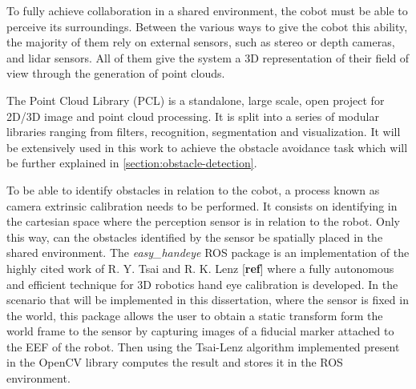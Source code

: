 \par To fully achieve collaboration in a shared environment, the cobot must be able to perceive its surroundings. Between the various ways to give the cobot this ability, the majority of them rely on external sensors, such as stereo or depth cameras, and lidar sensors. All of them give the system a 3D representation of their field of view through the generation of point clouds.
\par The Point Cloud Library (PCL) is a standalone, large scale, open project for 2D/3D image and point cloud processing. It is split into a series of modular libraries ranging from filters, recognition, segmentation and visualization. It will be extensively used in this work to achieve the obstacle avoidance task which will be further explained in \autoref{section:obstacle-detection}.
\par To be able to identify obstacles in relation to the cobot, a process known as camera extrinsic calibration needs to be performed. It consists on identifying in the cartesian space where the perception sensor is in relation to the robot. Only this way, can the obstacles identified by the sensor be spatially placed in the shared environment. The \textit{easy\_handeye} ROS package is an implementation of the highly cited work of R. Y. Tsai and R. K. Lenz [\textbf{ref}] where a fully autonomous and efficient technique for 3D robotics hand eye calibration is developed. In the scenario that will be implemented in this dissertation, where the sensor is fixed in the world, this package allows the user to obtain a static transform form the world frame to the sensor by capturing images of a fiducial marker attached to the EEF of the robot. Then using the Tsai-Lenz algorithm implemented present in the OpenCV library computes the result and stores it in the ROS environment.



